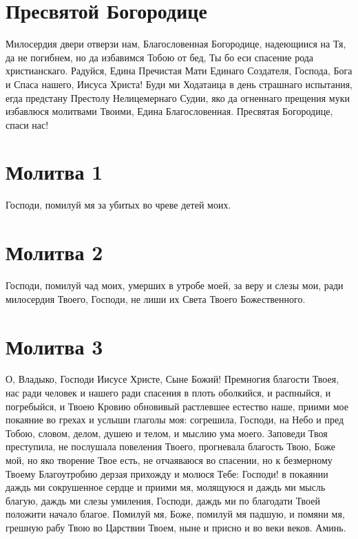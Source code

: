 \section{Пресвятой Богородице}\begin{mymulticols}


Милосердия двери отверзи нам, Благословенная Богородице, надеющиися на Тя, да не погибнем, но да избавимся Тобою от бед, Ты бо еси спасение рода христианскаго. Радуйся, Едина Пречистая Мати Единаго Создателя, Господа, Бога и Спаса нашего, Иисуса Христа! Буди ми Ходатаица в день страшнаго испытания, егда предстану Престолу Нелицемернаго Судии, яко да огненнаго прещения муки избавлюся молитвами Твоими, Едина Благословенная. Пресвятая Богородице, спаси нас!


\end{mymulticols}

\section{Молитва 1}

Господи, помилуй мя за убитых во чреве детей моих.

\section{Молитва 2}

Господи, помилуй чад моих, умерших в утробе моей, за веру и слезы мои, ради милосердия Твоего, Господи, не лиши их Света Твоего Божественного.

\section{Молитва 3}\begin{mymulticols}



О, Владыко, Господи Иисусе Христе, Сыне Божий! Премногия благости Твоея, нас ради человек и нашего ради спасения в плоть оболкийся, и распныйся, и погребыйся, и Твоею Кровию обновивый растлевшее естество наше, приими мое покаяние во грехах и услыши глаголы моя: согрешила, Господи, на Небо и пред Тобою, словом, делом, душею и телом, и мыслию ума моего. Заповеди Твоя преступила, не послушала повеления Твоего, прогневала благость Твою, Боже мой, но яко творение Твое есть, не отчаяваюся во спасении, но к безмерному Твоему Благоутробию дерзая прихожду и молюся Тебе: Господи! в покаянии даждь ми сокрушенное сердце и приими мя, молящуюся и даждь ми мысль благую, даждь ми слезы умиления, Господи, даждь ми по благодати Твоей положити начало благое. Помилуй мя, Боже, помилуй мя падшую, и помяни мя, грешную рабу Твою во Царствии Твоем, ныне и присно и во веки веков. Аминь.

\end{mymulticols}

